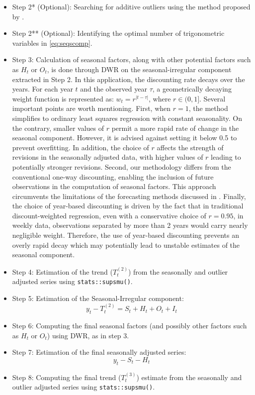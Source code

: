 \begin{itemize}
\item
  Step 2* (Optional): Searching for additive outliers using the method proposed by \citet{findley1998}.
\item
  Step 2** (Optional): Identifying the optimal number of trigonometric variables in \eqref{eq:seqscomp}.
\item
  Step 3: Calculation of seasonal factors, along with other potential factors such as \(H_{t}\) or \(O_{t}\), is done through DWR on the seasonal-irregular component extracted in Step 2. In this application, the discounting rate decays over the years. For each year \(t\) and the observed year \(\tau\), a geometrically decaying weight function is represented as: \(w_{t}=r^{|t-\tau|}\), where \(r \in (0,1]\). Several important points are worth mentioning. First, when \(r=1\), the method simplifies to ordinary least squares regression with constant seasonality. On the contrary, smaller values of \(r\) permit a more rapid rate of change in the seasonal component. However, it is advised against setting it below 0.5 to prevent overfitting. In addition, the choice of \(r\) affects the strength of revisions in the seasonally adjusted data, with higher values of \(r\) leading to potentially stronger revisions. Second, our methodology differs from the conventional one-way discounting, enabling the inclusion of future observations in the computation of seasonal factors. This approach circumvents the limitations of the forecasting methods discussed in \citet{bandara2021mstl}. Finally, the choice of year-based discounting is driven by the fact that in traditional discount-weighted regression, even with a conservative choice of \(r=0.95\), in weekly data, observations separated by more than 2 years would carry nearly negligible weight. Therefore, the use of year-based discounting prevents an overly rapid decay which may potentially lead to unstable estimates of the seasonal component.
\item
  Step 4: Estimation of the trend (\(T_{t}^{(2)}\)) from the seasonally and outlier adjusted series using \texttt{stats::supsmu()}.
\item
  Step 5: Estimation of the Seasonal-Irregular component:
  \[y_{t}-T_{t}^{(2)}=S_{t}+H_{t}+O_{t}+I_{t}\]
\item
  Step 6: Computing the final seasonal factors (and possibly other factors such as \(H_{t}\) or \(O_{t}\)) using DWR, as in step 3.
\item
  Step 7: Estimation of the final seasonally adjusted series:
  \[y_{t}-S_{t}-H_{t}\]
\item
  Step 8: Computing the final trend (\(T_{t}^{(3)}\)) estimate from the seasonally and outlier adjusted series using \texttt{stats::supsmu()}.
\end{itemize}

